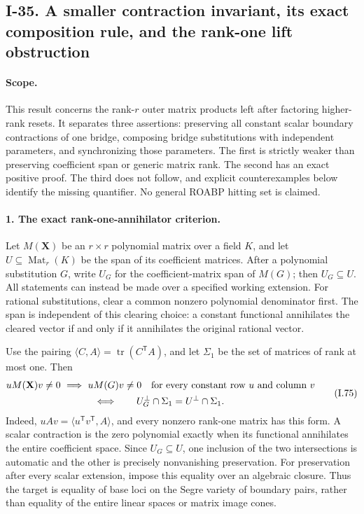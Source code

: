 \subsection{I-35. A smaller contraction invariant, its exact composition rule, and the rank-one lift obstruction}
\label{I-35}

\paragraph{Scope.}
This result concerns the rank-$r$ outer matrix products left after
factoring higher-rank resets. It separates three assertions:
preserving all constant scalar boundary contractions of one bridge,
composing bridge substitutions with independent parameters, and
synchronizing those parameters. The first is strictly weaker than
preserving coefficient span or generic matrix rank. The second has
an exact positive proof. The third does not follow, and explicit
counterexamples below identify the missing quantifier. No general
ROABP hitting set is claimed.

\paragraph{1. The exact rank-one-annihilator criterion.}
Let $M(\mathbf X)$ be an $r\times r$ polynomial matrix over a field
$K$, and let $U\subseteq\operatorname{Mat}_r(K)$ be the span of its
coefficient matrices. After a polynomial substitution $G$, write
$U_G$ for the coefficient-matrix span of $M(G)$; then $U_G\subseteq U$.
All statements can instead be made over a specified working extension.
For rational substitutions, clear a common nonzero polynomial
denominator first. The span is independent of this clearing choice:
a constant functional annihilates the cleared vector if and only if
it annihilates the original rational vector.

Use the pairing $\langle C,A\rangle=\operatorname{tr}(C^{\mathsf T}A)$,
and let $\Sigma_1$ be the set of matrices of rank at most one. Then
\[
 \begin{gathered}
 uM(\mathbf X)v\ne0\ \Longrightarrow\ uM(G)v\ne0
       \quad\hbox{for every constant row }u\hbox{ and column }v
 \\
 \Longleftrightarrow\qquad
 U_G^\perp\cap\Sigma_1=U^\perp\cap\Sigma_1.
 \end{gathered}
 \tag{I.75}
\]
Indeed, $uAv=\langle u^{\mathsf T}v^{\mathsf T},A\rangle$, and every
nonzero rank-one matrix has this form. A scalar contraction is the
zero polynomial exactly when its functional annihilates the entire
coefficient space. Since $U_G\subseteq U$, one inclusion of the two
intersections is automatic and the other is precisely nonvanishing
preservation. For preservation after every scalar extension, impose
this equality over an algebraic closure. Thus the target is equality
of base loci on the Segre variety of boundary pairs, rather than
equality of the entire linear spaces or matrix image cones.

